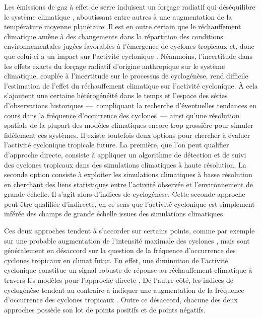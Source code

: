 \documentclass[../main.tex]{subfiles}
\begin{document}
Les émissions de gaz à effet de serre induisent un forçage radiatif qui déséquilibre le système climatique \parencite{charney_carbon_1979}, aboutissant entre
autres à une augmentation de la température moyenne planétaire. Il est en outre certain que le réchauffement climatique amène à des changements dans la
répartition des conditions environnementales jugées favorables à l'émergence de cyclones tropicaux et, donc que celui-ci a un impact sur l'activité cyclonique
\parencite{seneviratne_weather_2021}. Néanmoins, l'incertitude dans les effets exacts du forçage radiatif d'origine anthropique sur le système climatique,
couplée à l'incertitude sur le processus de cyclogénèse, rend difficile l'estimation de l'effet du réchauffement climatique sur l'activité cyclonique. À cela
s'ajoutent une certaine hétérogénéité dans le temps et l'espace des séries d'observations historiques ---~compliquant la recherche d'éventuelles tendances en
cours dans la fréquence d'occurrence des cyclones~--- ainsi qu'une résolution spatiale de la plupart des modèles climatiques encore trop grossière pour simuler
fidèlement ces systèmes. Il existe toutefois deux options pour chercher à évaluer l'activité cyclonique tropicale future. La première, que l'on peut qualifier
d'approche directe, consiste à appliquer un algorithme de détection et de suivi des cyclones tropicaux dans des simulations climatiques à haute résolution. La
seconde option consiste à exploiter les simulations climatiques à basse résolution en cherchant des liens statistiques entre l'activité observée et
l'environnement de grande échelle. Il s'agit alors d'indices de cyclogénèse. Cette seconde approche peut être qualifiée d'indirecte, en ce sens que l'activité
cyclonique est simplement inférée des champs de grande échelle issues des simulations climatiques.

Ces deux approches tendent à s'accorder sur certains points, comme par exemple sur une probable augmentation de l'intensité maximale des cyclones
\parencite{sobel_human_2016,bhatia_projected_2018}, mais sont généralement en désaccord sur la question de la fréquence d'occurrence des cyclones tropicaux en
climat futur. En effet, une diminution de l'activité cyclonique constitue un signal robuste de réponse au réchauffement climatique à travers les modèles pour
l'approche directe \parencite{christensen_climate_2013,knutson_tropical_2020}. De l'autre côté, les indices de cyclogénèse tendent au contraire à indiquer une
augmentation de la fréquence d'occurrence des cyclones tropicaux \parencite{emanuel_downscaling_2013,camargo_testing_2014}. Outre ce désaccord, chacune des deux
approches possède son lot de points positifs et de points négatifs.
\end{document}

